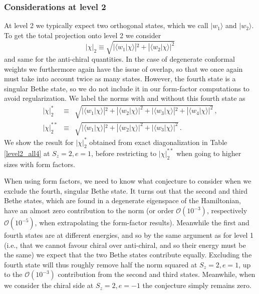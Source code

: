 \documentclass[a4paper,10pt]{article}
\newcommand{\linnea}[1]{$\framebox{\tiny L}$\ \textbf{\texttt{{\color{red}\footnotesize#1}}}}
\begin{document}
\subsubsection{Considerations at level 2}\label{level2_considerations}
At level 2 we typically expect two orthogonal states, which we call $|w_1\rangle$ and $|w_2\rangle$. To get the total projection onto level 2 we consider
\begin{equation}\label{level2norm}
| \chi |_2 \equiv \sqrt{ |\langle w_1 | \chi \rangle|^2 + |\langle w_2 | \chi \rangle|^2}
\end{equation}
and same for the anti-chiral quantities. In the case of degenerate conformal weights we furthermore again have the issue of overlap, %
%
so that we once again must take into account twice as many states. However, the fourth state is a singular Bethe state, so we do not include it in our form-factor computations to avoid regularization. We label the norms with and without this fourth state as
\begin{subequations}\label{level2norm2}
\begin{eqnarray}
| \chi |_2^{*} & \equiv & \sqrt{ |\langle w_1 | \chi \rangle|^2 + |\langle w_2 | \chi \rangle|^2+ |\langle w_3 | \chi \rangle|^2+ |\langle w_4 | \chi \rangle|^2} \,, \\  \label{level2norm2a}
| \chi |_2^{**} &\equiv & \sqrt{ |\langle w_1 | \chi \rangle|^2 + |\langle w_2 | \chi \rangle|^2+ |\langle w_3 | \chi \rangle|^2} \,.   \label{level2norm2b}
\end{eqnarray}
\end{subequations}
We show the result for $| \chi |_2^{*}$ obtained from exact diagonalization in Table \ref{level2_all4} at $S_z=2,e=1$, before restricting to $| \chi |_2^{**}$ when going to higher sizes with form factors. 

When using form factors, we need to know what conjecture to consider when we exclude the fourth, singular Bethe state. It turns out that the second and third Bethe states, which are found in a degenerate eigenspace of the Hamiltonian, have an almost zero contribution to the norm (or order $\mathcal{O}(10^{-3})$, respectively $\mathcal{O}(10^{-5})$, when extrapolating the form-factor results). Meanwhile the first and fourth states are at different energies, and so by the same argument as for level 1 (i.e., that we cannot favour chiral over anti-chiral, and so their energy must be the same) we expect that the two Bethe states contribute equally. Excluding the fourth state will thus roughly remove half the norm squared at $S_z=2,e=1$, up to the $\mathcal{O}(10^{-3})$ contribution from the second and third states. Meanwhile, when we consider the chiral side at $S_z=2,e=-1$ the conjecture simply remains zero. 
\end{document}
